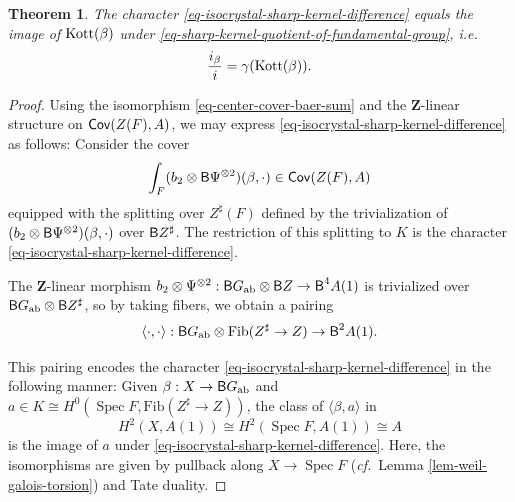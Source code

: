 \documentclass[10pt,english,reqno]{amsart}
\newcommand{\integers}{\mathbf Z}
\newcommand{\Kottwitz}{\textnormal{Kott}}
\newcommand{\Cov}{\textnormal{\textsf{Cov}}}
\newcommand{\Fib}{\mathrm{Fib}}
\newcommand{\deloop}{\textnormal{\textsf{B}}}
\newcommand{\Spec}{\operatorname{Spec}}
\newcommand{\abelian}{\textnormal{ab}}
\newtheorem{thm}[subsubsection]{Theorem}
\theoremstyle{definition}
\numberwithin{equation}{section}
\begin{document}
\begin{thm}
\label{thm-inclusion-difference-kottwitz-invariant}
The character \eqref{eq-isocrystal-sharp-kernel-difference} equals the image of $\Kottwitz(\beta)$ under \eqref{eq-sharp-kernel-quotient-of-fundamental-group}, \emph{i.e.}
\begin{equation}
\label{eq-inclusion-difference-kottwitz-invariant}
\frac{i_{\beta}}{i} = \gamma(\Kottwitz(\beta)).
\end{equation}
\end{thm}
\begin{proof}
Using the isomorphism \eqref{eq-center-cover-baer-sum} and the $\integers$-linear structure on $\Cov(Z(F), A)$, we may express \eqref{eq-isocrystal-sharp-kernel-difference} as follows: Consider the cover
$$
\int_F(b_2 \otimes \deloop\Psi^{\otimes 2})(\beta, \cdot) \in \Cov(Z(F), A)
$$
equipped with the splitting over $Z^{\sharp}(F)$ defined by the trivialization of $(b_2\otimes \deloop\Psi^{\otimes 2})(\beta, \cdot)$ over $\deloop Z^{\sharp}$. The restriction of this splitting to $K$ is the character \eqref{eq-isocrystal-sharp-kernel-difference}.

The $\integers$-linear morphism $b_2\otimes \Psi^{\otimes 2} : \deloop G_{\abelian} \otimes \deloop Z \rightarrow \deloop^4A(1)$ is trivialized over $\deloop G_{\abelian} \otimes \deloop Z^{\sharp}$, so by taking fibers, we obtain a pairing
$$
\langle\cdot, \cdot\rangle : \deloop G_{\abelian}\otimes \Fib(Z^{\sharp} \rightarrow Z) \rightarrow \deloop^2A(1).
$$

This pairing encodes the character \eqref{eq-isocrystal-sharp-kernel-difference} in the following manner: Given $\beta : X \rightarrow \deloop G_{\abelian}$ and $a \in K \cong H^0(\Spec F, \Fib(Z^{\sharp} \rightarrow Z))$, the class of $\langle\beta, a\rangle$ in
\begin{equation}
\label{eq-tate-duality-for-isoc}
H^2(X, A(1)) \cong H^2(\Spec F, A(1)) \cong A
\end{equation}
is the image of $a$ under \eqref{eq-isocrystal-sharp-kernel-difference}. Here, the isomorphisms are given by pullback along $X \rightarrow \Spec F$ (\emph{cf.}~Lemma \ref{lem-weil-galois-torsion}) and Tate duality.


\end{proof}
\end{document}
